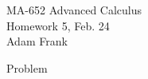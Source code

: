 \documentclass{article}
\begin{document}
  \begin{center} \Large
    MA-652 Advanced Calculus\\
    Homework 5, Feb. 24 \\
    Adam Frank
  \end{center}

  \vspace{1cm}

  {\Large \color{Sepia} Problem }

  \vspace{1cm}

  \pagebreak
\end{document}
